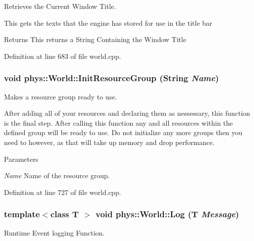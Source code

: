 Retrieves the Current Window Title. 

This gets the texts that the engine has stored for use in the title bar \begin{DoxyReturn}{Returns}
This returns a String Containing the Window Title 
\end{DoxyReturn}


Definition at line 683 of file world.cpp.

\hypertarget{classphys_1_1World_a82b1b40f39c1f2e48759fdb77389153d}{
\subsubsection[{InitResourceGroup}]{\setlength{\rightskip}{0pt plus 5cm}void phys::World::InitResourceGroup ({\bf String} {\em Name})}}
\label{da/ddf/classphys_1_1World_a82b1b40f39c1f2e48759fdb77389153d}


Makes a resource group ready to use. 

After adding all of your resources and declaring them as nessessary, this function is the final step. After calling this function any and all resources within the defined group will be ready to use. Do not initialize any more groups then you need to however, as that will take up memory and drop performance. 
\begin{DoxyParams}{Parameters}
\item[{\em Name}]Name of the resource group. \end{DoxyParams}


Definition at line 727 of file world.cpp.

\hypertarget{classphys_1_1World_a05267a20e8d5518771d0848190b33d60}{
\subsubsection[{Log}]{\setlength{\rightskip}{0pt plus 5cm}template$<$class T $>$ void phys::World::Log (T {\em Message})}}
\label{da/ddf/classphys_1_1World_a05267a20e8d5518771d0848190b33d60}


Runtime Event logging Function. 

